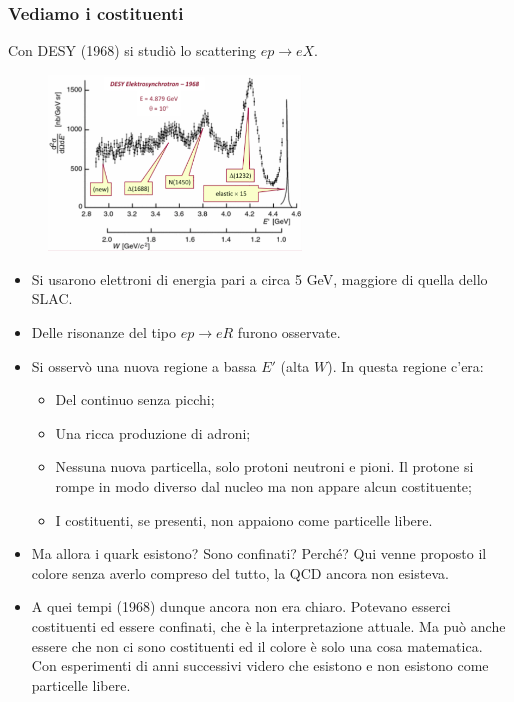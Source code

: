 \subsubsection{Vediamo i costituenti}
Con DESY (1968) si studiò lo scattering $ep\to eX$.
\begin{figure}[H]
    \centering
    \includegraphics[width=0.6\textwidth]{immagini/fig_desy_1968.png}
\end{figure}
\begin{itemize}
    \item Si usarono elettroni di energia pari a circa 5 GeV, maggiore di quella dello SLAC.
    \item Delle risonanze del tipo $ep\to eR$ furono osservate.
    \item Si osservò una nuova regione a bassa $E'$ (alta $W$). In questa regione c'era:
    \begin{itemize}
        \item Del continuo senza picchi;
        \item Una ricca produzione di adroni;
        \item Nessuna nuova particella, solo protoni neutroni e pioni. Il protone si rompe in modo diverso dal nucleo ma non appare alcun costituente;
        \item I costituenti, se presenti, non appaiono come particelle libere.
    \end{itemize}
    \item Ma allora i quark esistono? Sono confinati? Perché? Qui venne proposto il colore senza averlo compreso del tutto, la QCD ancora non esisteva.
    \item A quei tempi (1968) dunque ancora non era chiaro. Potevano esserci costituenti ed essere confinati, che è la interpretazione attuale. Ma può anche essere che non ci sono costituenti ed il colore è solo una cosa matematica. Con esperimenti di anni successivi videro che esistono e non esistono come particelle libere.
\end{itemize}
